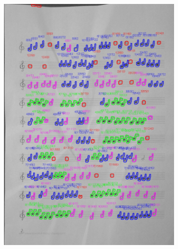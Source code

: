 \documentclass[11pt]{article}
\begin{document}
\begin{figure}[H]
\begin{subfigure}{.45\textwidth}
        \includegraphics[width=\linewidth]{20_cnts.jpg}
        \label{fig:sub2}
    \end{subfigure}
    \label{fig:test}
\end{figure}
\end{document}
